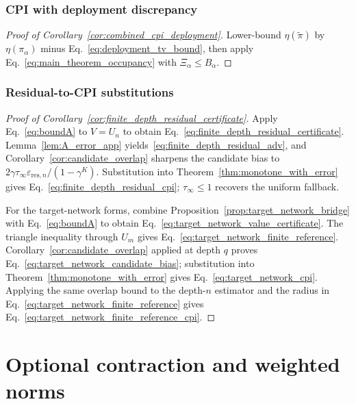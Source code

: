 \documentclass{article}
\theoremstyle{plain}
\theoremstyle{definition}
\theoremstyle{remark}
\begin{document}
\subsubsection{CPI with deployment discrepancy}
\label{app:proof_combined_deployment}

\begin{proof}[Proof of Corollary~\ref{cor:combined_cpi_deployment}]
Lower-bound $\eta(\widetilde\pi)$ by $\eta(\pi_\alpha)$ minus
Eq.~\eqref{eq:deployment_tv_bound}, then apply
Eq.~\eqref{eq:main_theorem_occupancy} with $\Xi_\alpha\le B_\alpha$.
\end{proof}

\subsubsection{Residual-to-CPI substitutions}
\label{app:proof_residual_substitutions}

\begin{proof}[Proof of Corollary~\ref{cor:finite_depth_residual_certificate}]
Apply Eq.~\eqref{eq:boundA} to $V=U_n$ to obtain
Eq.~\eqref{eq:finite_depth_residual_certificate}.
Lemma~\ref{lem:A_error_app} yields~\eqref{eq:finite_depth_residual_adv}, and
Corollary~\ref{cor:candidate_overlap} sharpens the candidate bias to
$2\gamma\tau_\infty\varepsilon_{\mathrm{res},n}/(1-\gamma^K)$.
Substitution into Theorem~\ref{thm:monotone_with_error} gives
Eq.~\eqref{eq:finite_depth_residual_cpi}; $\tau_\infty\le1$ recovers the
uniform fallback.

For the target-network forms, combine
Proposition~\ref{prop:target_network_bridge} with Eq.~\eqref{eq:boundA} to
obtain Eq.~\eqref{eq:target_network_value_certificate}. The triangle
inequality through $U_m$ gives Eq.~\eqref{eq:target_network_finite_reference}.
Corollary~\ref{cor:candidate_overlap} applied at depth $q$ proves
Eq.~\eqref{eq:target_network_candidate_bias}; substitution into
Theorem~\ref{thm:monotone_with_error} gives Eq.~\eqref{eq:target_network_cpi}.
Applying the same overlap bound to the depth-$n$ estimator and the radius
in Eq.~\eqref{eq:target_network_finite_reference} gives
Eq.~\eqref{eq:target_network_finite_reference_cpi}.
\end{proof}

\section{Optional contraction and weighted norms}
\label{app:optional_extensions}
\end{document}
